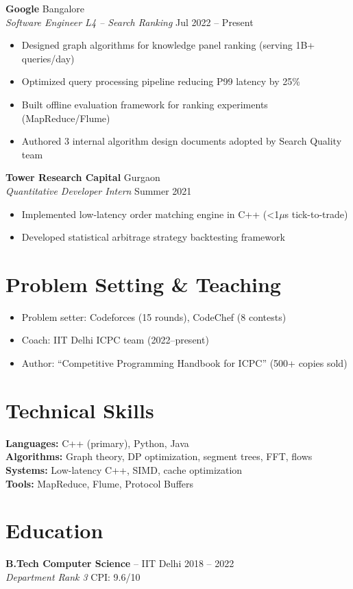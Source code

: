 \documentclass[10pt,letterpaper]{article}
\begin{document}
\textbf{Google} \hfill Bangalore\\
\textit{Software Engineer L4 -- Search Ranking} \hfill Jul 2022 -- Present
\begin{itemize}
\item Designed graph algorithms for knowledge panel ranking (serving 1B+ queries/day)
\item Optimized query processing pipeline reducing P99 latency by 25\%
\item Built offline evaluation framework for ranking experiments (MapReduce/Flume)
\item Authored 3 internal algorithm design documents adopted by Search Quality team
\end{itemize}

\textbf{Tower Research Capital} \hfill Gurgaon\\
\textit{Quantitative Developer Intern} \hfill Summer 2021
\begin{itemize}
\item Implemented low-latency order matching engine in C++ (<1$\mu$s tick-to-trade)
\item Developed statistical arbitrage strategy backtesting framework
\end{itemize}

\section{Problem Setting \& Teaching}
\begin{itemize}
\item Problem setter: Codeforces (15 rounds), CodeChef (8 contests)
\item Coach: IIT Delhi ICPC team (2022--present)
\item Author: ``Competitive Programming Handbook for ICPC'' (500+ copies sold)
\end{itemize}

\section{Technical Skills}
\textbf{Languages:} C++ (primary), Python, Java\\
\textbf{Algorithms:} Graph theory, DP optimization, segment trees, FFT, flows\\
\textbf{Systems:} Low-latency C++, SIMD, cache optimization\\
\textbf{Tools:} MapReduce, Flume, Protocol Buffers

\section{Education}
\textbf{B.Tech Computer Science} -- IIT Delhi \hfill 2018 -- 2022\\
\textit{Department Rank 3} \hfill CPI: 9.6/10
\end{document}
